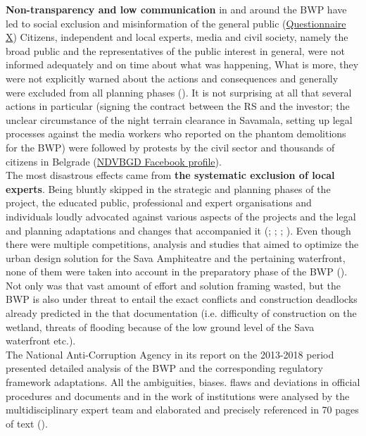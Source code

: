 \documentclass[11pt]{report}
\begin{document}
\textbf{Non-transparency and low communication} in and around the BWP have led to social exclusion and misinformation of the general public
(\href{Questionnaire Experts Savamala}{Questionnaire X})
Citizens, independent and local experts, media and civil society, namely the broad public and the representatives of the public interest in general, were not informed adequately and on time about what was happening,
What is more, they were not explicitly warned about the actions and consequences and generally were excluded from all planning phases
(\href{ref}{\citealt{ministarstvo_prostora_urbani_2014}}). 
It is not surprising at all that several actions in particular (signing the contract between the RS and the investor; the unclear circumstance of the night terrain clearance in Savamala, setting up legal processes against the media workers who reported on the phantom demolitions for the BWP) were followed by protests by the civil sector and thousands of citizens in Belgrade (\href{NDVBGD}{NDVBGD Facebook profile}).
\\

The most disastrous effects came from \textbf{the systematic exclusion of local experts}.
Being bluntly skipped in the strategic and planning phases of the project, the educated public, professional and expert organisations and individuals loudly advocated against various aspects of the projects and the legal and planning adaptations and changes that accompanied it 
(\href{ref}{\citealt{stojkov_crne_2015}}; \href{ref}{\citealt{stojkov_zaboravljene_2015}}; \href{ref}{\citealt{stojkov_sahrana_2015}}; \href{ref}{\citealt{stojkov_djindjuve_2015}}).
Even though there were multiple competitions, analysis and studies that aimed to optimize the urban design solution for the Sava Amphiteatre and the pertaining waterfront, none of them were taken into account in the preparatory phase of the BWP (\cite{studija SANU}).
Not only was that vast amount of effort and solution framing wasted, but the BWP is also under threat to entail the exact conflicts and construction deadlocks already predicted in the that documentation (i.e. difficulty of construction on the wetland, threats of flooding because of the low ground level of the Sava waterfront etc.).
\\

The National Anti-Corruption Agency in its report on the 2013-2018 period presented detailed analysis of the BWP and the corresponding regulatory framework adaptations. All the ambiguities, biases. flaws and deviations in official procedures and documents and in the work of institutions were analysed by the multidisciplinary expert team and elaborated and precisely referenced in 70 pages of text (\href{ref}{\citealt{pravni_skener_alternativni_2016}}).
\\
\end{document}
